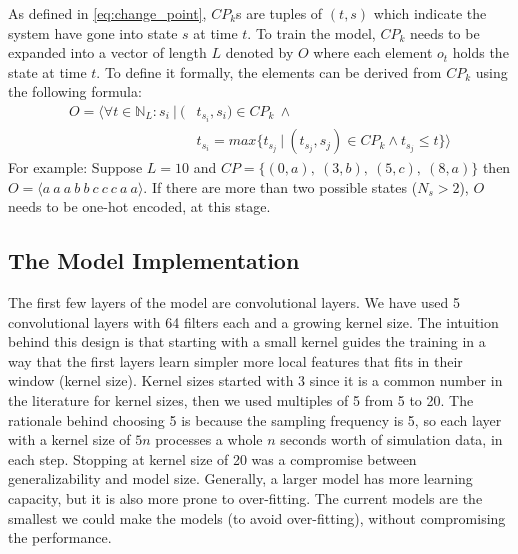 As defined in \eqref{eq:change_point}, $CP_k$s are tuples of $(t, s)$ which indicate the system have gone into state $s$ at time $t$. To train the model, $CP_k$ needs to be expanded into a vector of length $L$ denoted by $O$ where each element $o_t$ holds the state at time $t$. To define it formally, the elements can be derived from $CP_k$ using the following formula:
\begin{equation} \label{eq:output}
\begin{split}
O = \langle  \forall t \in \mathbb{N}_L : s_i \:|\:
           (& t_{s_i}, s_i) \in CP_k \: \land  \\
            & t_{s_i} = max\{t_{s_j} \:|\: (t_{s_j}, s_j) \in CP_k \land t_{s_j}\leq t\} \rangle
\end{split}
\end{equation}
For example: Suppose $L=10$ and $CP = \{(0, a),\:(3, b),\:(5, c),\:(8, a)\}$ 
then $O = \langle a\:a\:a\:b\:b\:c\:c\:c\:a\:a \rangle$.
If there are more than two possible states ($N_s > 2$), $O$ needs to be one-hot encoded, at this stage.



\subsection{The Model Implementation} \label{sec:architecture_detail}
The first few layers of the model are convolutional layers. We have used 5 convolutional layers with 64 filters each and a growing kernel size.
The intuition behind this design is that starting with a small kernel guides the training in a way that the first layers learn simpler more local features that fits in their window (kernel size).
Kernel sizes started with 3 since it is a common number in the literature for kernel sizes, then we used multiples of 5 from 5 to 20. 
The rationale behind choosing 5 is because the sampling frequency is 5, so each layer with a kernel size of $5n$ processes a whole $n$ seconds worth of simulation data, in each step.
Stopping at kernel size of 20 was a compromise between generalizability and model size. Generally, a larger model has more learning capacity, but it is also more prone to over-fitting. The current models are the smallest we could make the models (to avoid over-fitting), without compromising the performance.


